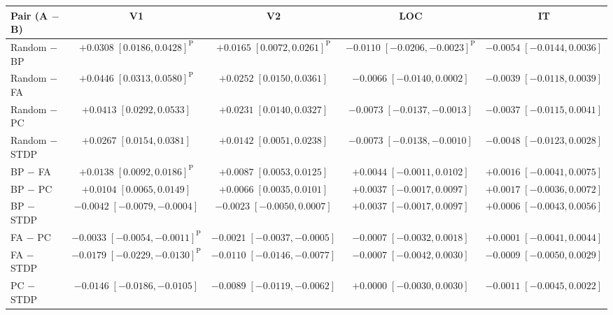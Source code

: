 \begin{tabular}{lcccc}
\toprule
Pair (A $-$ B) & V1 & V2 & LOC & IT \\
\midrule
Random $-$ BP & $\mathbf{+0.0308}\;[0.0186,0.0428]^{\mathrm{P}}$ & $\mathbf{+0.0165}\;[0.0072,0.0261]^{\mathrm{P}}$ & $\mathbf{-0.0110}\;[-0.0206,-0.0023]^{\mathrm{P}}$ & $-0.0054\;[-0.0144,0.0036]$ \\
Random $-$ FA & $\mathbf{+0.0446}\;[0.0313,0.0580]^{\mathrm{P}}$ & $\mathbf{+0.0252}\;[0.0150,0.0361]$ & $-0.0066\;[-0.0140,0.0002]$ & $-0.0039\;[-0.0118,0.0039]$ \\
Random $-$ PC & $\mathbf{+0.0413}\;[0.0292,0.0533]$ & $\mathbf{+0.0231}\;[0.0140,0.0327]$ & $\mathbf{-0.0073}\;[-0.0137,-0.0013]$ & $-0.0037\;[-0.0115,0.0041]$ \\
Random $-$ STDP & $\mathbf{+0.0267}\;[0.0154,0.0381]$ & $\mathbf{+0.0142}\;[0.0051,0.0238]$ & $\mathbf{-0.0073}\;[-0.0138,-0.0010]$ & $-0.0048\;[-0.0123,0.0028]$ \\
BP $-$ FA & $\mathbf{+0.0138}\;[0.0092,0.0186]^{\mathrm{P}}$ & $\mathbf{+0.0087}\;[0.0053,0.0125]$ & $+0.0044\;[-0.0011,0.0102]$ & $+0.0016\;[-0.0041,0.0075]$ \\
BP $-$ PC & $\mathbf{+0.0104}\;[0.0065,0.0149]$ & $\mathbf{+0.0066}\;[0.0035,0.0101]$ & $+0.0037\;[-0.0017,0.0097]$ & $+0.0017\;[-0.0036,0.0072]$ \\
BP $-$ STDP & $\mathbf{-0.0042}\;[-0.0079,-0.0004]$ & $-0.0023\;[-0.0050,0.0007]$ & $+0.0037\;[-0.0017,0.0097]$ & $+0.0006\;[-0.0043,0.0056]$ \\
FA $-$ PC & $\mathbf{-0.0033}\;[-0.0054,-0.0011]^{\mathrm{P}}$ & $\mathbf{-0.0021}\;[-0.0037,-0.0005]$ & $-0.0007\;[-0.0032,0.0018]$ & $+0.0001\;[-0.0041,0.0044]$ \\
FA $-$ STDP & $\mathbf{-0.0179}\;[-0.0229,-0.0130]^{\mathrm{P}}$ & $\mathbf{-0.0110}\;[-0.0146,-0.0077]$ & $-0.0007\;[-0.0042,0.0030]$ & $-0.0009\;[-0.0050,0.0029]$ \\
PC $-$ STDP & $\mathbf{-0.0146}\;[-0.0186,-0.0105]$ & $\mathbf{-0.0089}\;[-0.0119,-0.0062]$ & $+0.0000\;[-0.0030,0.0030]$ & $-0.0011\;[-0.0045,0.0022]$ \\
\bottomrule
\end{tabular}
